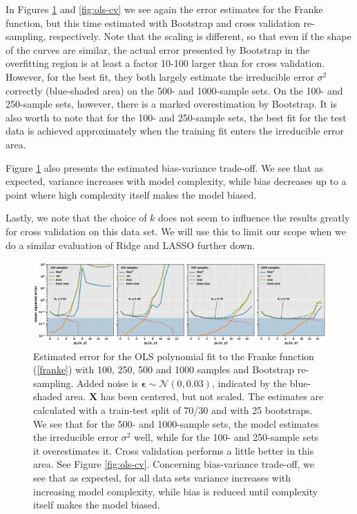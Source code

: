 \documentclass[]{article}
\begin{document}
In Figures \ref{fig:ols-bootstrap} and \ref{fig:ols-cv} we see again the error estimates for the Franke function, but this time estimated with Bootstrap and cross validation re-sampling, respectively. Note that the scaling is different, so that even if the shape of the curves are similar, the actual error presented by Bootstrap in the overfitting region is at least a factor 10-100 larger than for cross validation. However, for the best fit, they both largely estimate the irreducible error $\sigma^2$ correctly (blue-shaded area) on the 500- and 1000-sample sets. On the 100- and 250-sample sets, however, there is a marked overestimation by Bootstrap. It is also worth to note that for the 100- and 250-sample sets, the best fit for the test data is achieved approximately when the training fit enters the irreducible error area.

Figure \ref{fig:ols-bootstrap} also presents the estimated bias-variance trade-off. We see that as expected, variance increases with model complexity, while bias decreases up to a point where high complexity itself makes the model biased.

Lastly, we note that the choice of $k$ does not seem to influence the results greatly for cross validation on this data set. We will use this to limit our scope when we do a similar evaluation of Ridge and LASSO further down.

\begin{figure}[!htb]
	\centering
	\includegraphics[width=1\linewidth]{./results/ols-bootstrap.png}
	\caption{Estimated error for the OLS polynomial fit to the Franke function (\ref{franke}) with 100, 250, 500 and 1000 samples and Bootstrap re-sampling. Added noise is $\mathbf{\epsilon} \sim \mathcal{N}(0, 0.03)$, indicated by the blue-shaded area. $\mathbf{X}$ has been centered, but not scaled. The estimates are calculated with a train-test split of 70/30 and with 25 bootstraps. We see that for the 500- and 1000-sample sets, the model estimates the irreducible error $\sigma^2$ well, while for the 100- and 250-sample sets it overestimates it. Cross validation performs a little better in this area. See Figure \ref{fig:ols-cv}. Concerning bias-variance trade-off, we see that as expected, for all data sets variance increases with increasing model complexity, while bias is reduced until complexity itself makes the model biased.}
	\label{fig:ols-bootstrap}
\end{figure}
\end{document}
